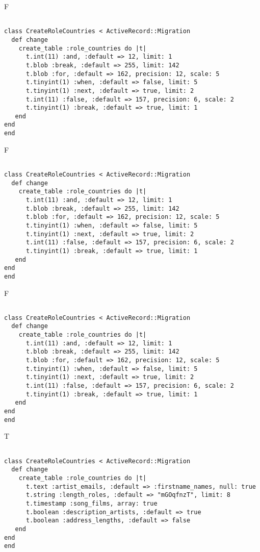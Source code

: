 F
\begin{verbatim}
		
class CreateRoleCountries < ActiveRecord::Migration 
  def change 
    create_table :role_countries do |t| 
      t.int(11) :and, :default => 12, limit: 1
      t.blob :break, :default => 255, limit: 142
      t.blob :for, :default => 162, precision: 12, scale: 5
      t.tinyint(1) :when, :default => false, limit: 5
      t.tinyint(1) :next, :default => true, limit: 2
      t.int(11) :false, :default => 157, precision: 6, scale: 2
      t.tinyint(1) :break, :default => true, limit: 1
   end
end
end
\end{verbatim}

F
\begin{verbatim}
		
class CreateRoleCountries < ActiveRecord::Migration 
  def change 
    create_table :role_countries do |t| 
      t.int(11) :and, :default => 12, limit: 1
      t.blob :break, :default => 255, limit: 142
      t.blob :for, :default => 162, precision: 12, scale: 5
      t.tinyint(1) :when, :default => false, limit: 5
      t.tinyint(1) :next, :default => true, limit: 2
      t.int(11) :false, :default => 157, precision: 6, scale: 2
      t.tinyint(1) :break, :default => true, limit: 1
   end
end
end
\end{verbatim}

F
\begin{verbatim}
		
class CreateRoleCountries < ActiveRecord::Migration 
  def change 
    create_table :role_countries do |t| 
      t.int(11) :and, :default => 12, limit: 1
      t.blob :break, :default => 255, limit: 142
      t.blob :for, :default => 162, precision: 12, scale: 5
      t.tinyint(1) :when, :default => false, limit: 5
      t.tinyint(1) :next, :default => true, limit: 2
      t.int(11) :false, :default => 157, precision: 6, scale: 2
      t.tinyint(1) :break, :default => true, limit: 1
   end
end
end
\end{verbatim}

T
\begin{verbatim}
		
class CreateRoleCountries < ActiveRecord::Migration 
  def change 
    create_table :role_countries do |t| 
      t.text :artist_emails, :default => :firstname_names, null: true
      t.string :length_roles, :default => "mGOqfnzT", limit: 8
      t.timestamp :song_films, array: true
      t.boolean :description_artists, :default => true
      t.boolean :address_lengths, :default => false
   end
end
end
\end{verbatim}

